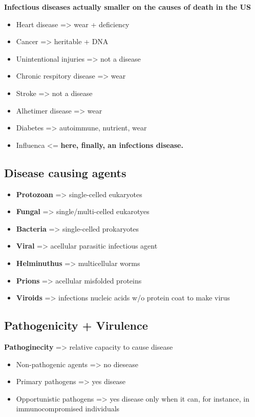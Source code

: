 \documentclass[letterpaper]{article}
\begin{document}
\textbf{Infectious diseases actually smaller on the causes of death in the US}

\begin{itemize}
\item Heart disease => wear + deficiency
\item Cancer => heritable + DNA
\item Unintentional injuries => not a disease
\item Chronic respitory disease => wear
\item Stroke => not a disease
\item Alhetimer disease => wear
\item Diabetes => autoimmune, nutrient, wear
\item Influenca <= \textbf{here, finally, an infections disease.}
\end{itemize}

\subsection{Disease causing agents}
\label{sec:org929053d}
\begin{itemize}
\item \textbf{Protozoan} => single-celled eukaryotes
\item \textbf{Fungal} => single/multi-celled eukarotyes
\item \textbf{Bacteria} => single-celled prokaryotes
\item \textbf{Viral} => acellular parasitic infectious agent
\item \textbf{Helminuthus} => multicellular worms
\item \textbf{Prions} => acellular misfolded proteins
\item \textbf{Viroids} => infections nucleic acids w/o protein coat to make virus
\end{itemize}

\subsection{Pathogenicity + Virulence}
\label{sec:org8abfa93}
\textbf{Pathoginecity} => relative capacity to cause disease

\begin{itemize}
\item Non-pathogenic agents => no diesease
\item Primary pathogens => yes disease
\item Opportunistic pathogens => yes disease only when it can, for instance,
in immunocompromised individuals
\end{itemize}
\end{document}
